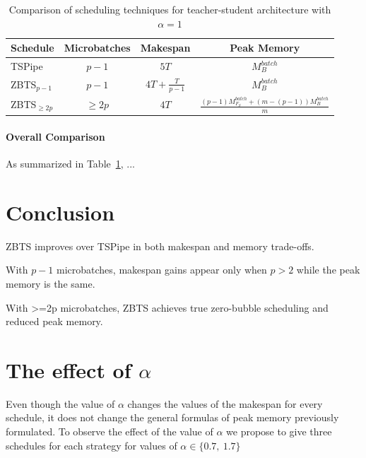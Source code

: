 \documentclass{article}
\begin{document}

\begin{table}[h]
\centering
\caption{Comparison of scheduling techniques for teacher-student architecture with $\alpha = 1$}
\label{tab:comparison}
\begin{tabular}{lccc}
\hline
\textbf{Schedule} & \textbf{Microbatches} & \textbf{Makespan} & \textbf{Peak Memory} \\
\hline
TSPipe & $p-1$ & $5T$ & $M_B^{batch}$ \\
ZBTS$_{p-1}$ & $p-1$ & $4T + \frac{T}{p-1}$ & $M_B^{batch}$ \\
ZBTS$_{\ge 2p}$ & $\ge 2p$ & $4T$ & $\frac{(p-1)M_{F_S}^{batch} + (m-(p-1))M_B^{batch}}{m}$ \\
\hline
\end{tabular}
\end{table}


\paragraph{Overall Comparison} As summarized in Table~\ref{tab:comparison}, 
...


\section{Conclusion}
ZBTS improves over TSPipe in both makespan and memory trade-offs.

With $p-1$ microbatches, makespan gains appear only when $p>2$ while the peak memory is the same.

With >=2p microbatches, ZBTS achieves true zero-bubble scheduling and reduced peak memory.




\appendix
\label{sec:appendix}

\section{The effect of $\alpha$}
Even though the value of $\alpha$ changes the values of the makespan for every schedule, it does not change the general formulas of peak memory previously formulated.
To observe the effect of the value of $\alpha$ we propose to give three schedules for each strategy for values of $\alpha \in \{0.7,~1.7\}$
\end{document}
